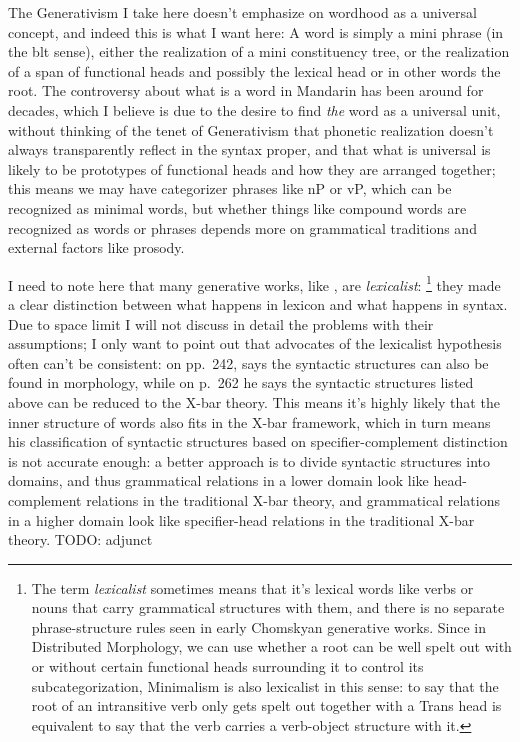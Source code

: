 \documentclass[UTF8, a4paper, oneside, scheme=plain]{ctexrep}
\newcommand*{\citepage}[1]{p.~{#1}}
\newcommand*{\citepages}[1]{pp.~{#1}}
\newcommand*{\term}[1]{\emph{#1}}
\begin{document}
The Generativism I take here doesn't emphasize on wordhood as a universal concept,
and indeed this is what I want here:
A word is simply a mini phrase (in the \acs{blt} sense),
either the realization of a mini constituency tree,
or the realization of a span of functional heads 
and possibly the lexical head or in other words the root.
The controversy about what is a word in Mandarin 
has been around for decades,
which I believe is due to the desire to 
find \emph{the} word as a universal unit,
without thinking of the tenet of Generativism 
that phonetic realization doesn't always 
transparently reflect in the syntax proper,
and that what is universal is likely to be 
prototypes of functional heads and how they are arranged together;
this means we may have categorizer phrases like nP or vP,
which can be recognized as minimal words,
but whether things like compound words are recognized as words or phrases 
depends more on grammatical traditions
and external factors like prosody.

I need to note here that 
many generative works, like \citet{deng2010formal},
are \emph{lexicalist}:%
\footnote{
    The term \term{lexicalist} sometimes means that  
    it's lexical words like verbs or nouns that carry grammatical structures with them, 
    and there is no separate phrase-structure rules 
    seen in early Chomskyan generative works.
    Since in Distributed Morphology, 
    we can use whether a root can be well spelt out 
    with or without certain functional heads surrounding it 
    to control its subcategorization,
    Minimalism is also lexicalist in this sense:
    to say that the root of an intransitive verb 
    only gets spelt out together with a Trans head 
    is equivalent to say that the verb carries a verb-object structure with it.
} 
they made a clear distinction between what happens in lexicon 
and what happens in syntax. 
Due to space limit I will not discuss in detail
the problems with their assumptions;
I only want to point out that advocates of the lexicalist hypothesis 
often can't be consistent:
on \citepages{242}, \citet{deng2010formal} says the syntactic structures 
can also be found in morphology,
while on \citepage{262} he says 
the syntactic structures listed above 
can be reduced to the X-bar theory.
This means it's highly likely that the inner structure of words 
also fits in the X-bar framework,
which in turn means his classification of syntactic structures 
based on specifier-complement distinction is not accurate enough:
a better approach is to divide syntactic structures into domains, 
and thus grammatical relations in a lower domain look like 
head-complement relations in the traditional X-bar theory, 
and grammatical relations in a higher domain look like 
specifier-head relations in the traditional X-bar theory.
TODO: adjunct 
\end{document}
